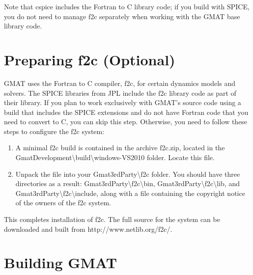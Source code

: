 \documentclass[letterpaper,10pt]{article}%
\begin{document}
\noindent Note that cspice includes the Fortran to C library code; if you build with SPICE, you do not need to manage f2c separately when working with the GMAT base library code.

\section{Preparing f2c (Optional)}

GMAT uses the Fortran to C compiler, f2c, for certain dynamics models and solvers.  The SPICE libraries from JPL include the f2c library code as part of their library.  If you plan to work exclusively with GMAT's source code using a build that includes the SPICE extensions and do not have Fortran code that you need to convert to C, you can skip this step.  Otherwise, you need to follow these steps to configure the f2c system:

\begin{enumerate}
\item A minimal f2c build is contained in the archive f2c.zip, located in the GmatDevelopment\textbackslash build\textbackslash windows-VS2010 folder.  Locate this file.
\item Unpack the file into your Gmat3rdParty\textbackslash f2c folder.  You should have three directories as a result: Gmat3rdParty\textbackslash f2c\textbackslash bin, Gmat3rdParty\textbackslash f2c\textbackslash lib, and Gmat3rdParty\textbackslash f2c\textbackslash include, along with a file containing the copyright notice of the owners of the f2c system.
\end{enumerate}

This completes installation of f2c.  The full source for the system can be downloaded and built from http://www.netlib.org/f2c/.

\section{Building GMAT}
\end{document}
